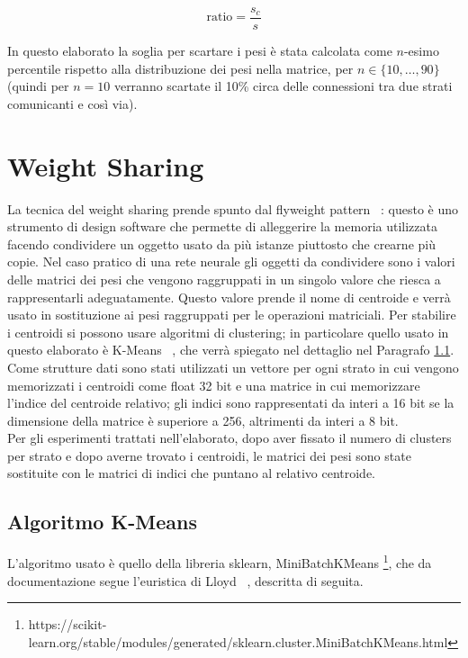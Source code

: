 \documentclass[12pt]{report}
\begin{document}
\begin{equation}
\mathrm{ratio} = \frac{s_c}{s}
\label{compressionRatio}
\end{equation}

In questo elaborato la soglia per scartare i pesi è stata calcolata come $n$-esimo percentile rispetto alla distribuzione dei pesi nella matrice, per $n \in \{10, \dots, 90 \}$ (quindi per $n=10$ verranno scartate il 10\% circa delle connessioni tra due strati comunicanti e così via).

\section{Weight Sharing}

La tecnica del weight sharing prende spunto dal flyweight pattern ~\cite{GOF}: questo è uno strumento di design software che permette di alleggerire la memoria utilizzata facendo condividere un oggetto usato da più istanze piuttosto che crearne più copie.
Nel caso pratico di una rete neurale gli oggetti da condividere sono i valori delle matrici dei pesi che vengono raggruppati in un singolo valore che riesca a rappresentarli adeguatamente. Questo valore prende il nome di centroide e verrà usato in sostituzione ai pesi raggruppati per le operazioni matriciali. 
Per stabilire i centroidi si possono usare algoritmi di clustering; in particolare quello usato in questo elaborato è K-Means ~\cite{KMeans}, che verrà spiegato nel dettaglio nel Paragrafo \ref{kmeans}. \\
Come strutture dati sono stati utilizzati un vettore per ogni strato in cui vengono memorizzati i centroidi come float 32 bit e una matrice in cui memorizzare l'indice del centroide relativo; gli indici sono rappresentati da interi a 16 bit se la dimensione della matrice è superiore a 256, altrimenti da interi a 8 bit. \\
Per gli esperimenti trattati nell'elaborato, dopo aver fissato il numero di clusters per strato e dopo averne trovato i centroidi, le matrici dei pesi sono state sostituite con le matrici di indici che puntano al relativo centroide. 

\subsection{Algoritmo K-Means}\label{kmeans}
L’algoritmo usato è quello della libreria sklearn, MiniBatchKMeans \footnote{https://scikit-learn.org/stable/modules/generated/sklearn.cluster.MiniBatchKMeans.html}, che da documentazione segue l’euristica di Lloyd ~\cite{Lloyd}, descritta di seguita.
\end{document}
